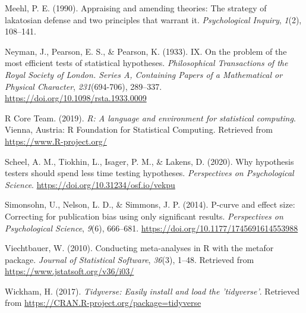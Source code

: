 \documentclass[
  english,
  doc,floatsintext]{apa6}
\begin{document}
\leavevmode\hypertarget{ref-meehl1990}{}%
Meehl, P. E. (1990). Appraising and amending theories: The strategy of lakatosian defense and two principles that warrant it. \emph{Psychological Inquiry}, \emph{1}(2), 108--141.

\leavevmode\hypertarget{ref-neyman1933}{}%
Neyman, J., Pearson, E. S., \& Pearson, K. (1933). IX. On the problem of the most efficient tests of statistical hypotheses. \emph{Philosophical Transactions of the Royal Society of London. Series A, Containing Papers of a Mathematical or Physical Character}, \emph{231}(694-706), 289--337. \url{https://doi.org/10.1098/rsta.1933.0009}

\leavevmode\hypertarget{ref-R-base}{}%
R Core Team. (2019). \emph{R: A language and environment for statistical computing}. Vienna, Austria: R Foundation for Statistical Computing. Retrieved from \url{https://www.R-project.org/}

\leavevmode\hypertarget{ref-scheel_why_2020}{}%
Scheel, A. M., Tiokhin, L., Isager, P. M., \& Lakens, D. (2020). Why hypothesis testers should spend less time testing hypotheses. \emph{Perspectives on Psychological Science}. \url{https://doi.org/10.31234/osf.io/vekpu}

\leavevmode\hypertarget{ref-simonsohn2014}{}%
Simonsohn, U., Nelson, L. D., \& Simmons, J. P. (2014). P-curve and effect size: Correcting for publication bias using only significant results. \emph{Perspectives on Psychological Science}, \emph{9}(6), 666--681. \url{https://doi.org/10.1177/1745691614553988}

\leavevmode\hypertarget{ref-R-metafor}{}%
Viechtbauer, W. (2010). Conducting meta-analyses in R with the metafor package. \emph{Journal of Statistical Software}, \emph{36}(3), 1--48. Retrieved from \url{https://www.jstatsoft.org/v36/i03/}

\leavevmode\hypertarget{ref-R-tidyverse}{}%
Wickham, H. (2017). \emph{Tidyverse: Easily install and load the 'tidyverse'}. Retrieved from \url{https://CRAN.R-project.org/package=tidyverse}

\endgroup
\end{document}
